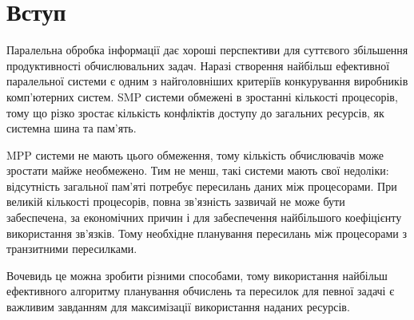 \section*{Вступ}

Паралельна обробка інформації дає хороші перспективи для суттєвого збільшення продуктивності обчислювальних задач. Наразі створення найбільш ефективної паралельної системи є одним з найголовніших критеріїв конкурування виробників комп'ютерних систем. SMP системи обмежені в зростанні кількості процесорів, тому що різко зростає кількість конфліктів доступу до загальних ресурсів, як системна шина та пам'ять.

MPP системи не мають цього обмеження, тому кількість обчислювачів може зростати майже необмежено. Тим не менш, такі системи мають свої недоліки: відсутність загальної пам'яті потребує пересилань даних між процесорами. При великій кількості процесорів, повна зв'язність зазвичай не може бути забеспечена, за економічних причин і для забеспечення найбільшого коефіцієнту використання зв'язків. Тому необхідне планування пересилань між процесорами з транзитними пересилками.

Вочевидь це можна зробити різними способами, тому використання найбільш ефективного алгоритму планування обчислень та пересилок для певної задачі є важливим завданням для максимізації використання наданих ресурсів.
